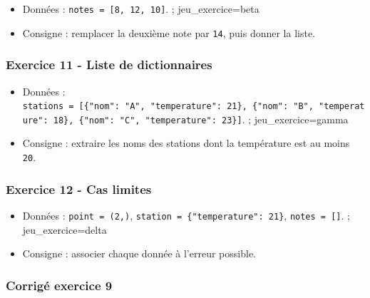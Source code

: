 \begin{itemize}
\tightlist
\item
  Données : \texttt{notes\ =\ {[}8,\ 12,\ 10{]}}. ; jeu\_exercice=beta
\item
  Consigne : remplacer la deuxième note par \texttt{14}, puis donner la
  liste.
\end{itemize}

\subsubsection{Exercice 11 - Liste de dictionnaires}

\begin{itemize}
\tightlist
\item
  Données :
  \texttt{stations\ =\ {[}\{"nom":\ "A",\ "temperature":\ 21\},\ \{"nom":\ "B",\ "temperature":\ 18\},\ \{"nom":\ "C",\ "temperature":\ 23\}{]}}.
  ; jeu\_exercice=gamma
\item
  Consigne : extraire les noms des stations dont la température est au
  moins \texttt{20}.
\end{itemize}

\subsubsection{Exercice 12 - Cas limites}

\begin{itemize}
\tightlist
\item
  Données : \texttt{point\ =\ (2,)},
  \texttt{station\ =\ \{"temperature":\ 21\}},
  \texttt{notes\ =\ {[}{]}}. ; jeu\_exercice=delta
\item
  Consigne : associer chaque donnée à l'erreur possible.
\end{itemize}

\subsubsection{Corrigé exercice 9}

